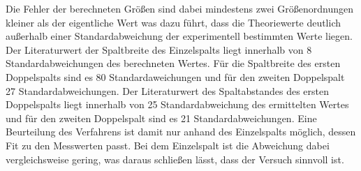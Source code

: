 Die Fehler der berechneten Größen sind dabei mindestens zwei Größenordnungen kleiner als der eigentliche Wert was dazu führt,
dass die Theoriewerte deutlich außerhalb einer Standardabweichung der experimentell bestimmten Werte liegen. Der
Literaturwert der Spaltbreite des Einzelspalts liegt innerhalb von 8 Standardabweichungen des berechneten Wertes. Für die
Spaltbreite des ersten Doppelspalts sind es 80 Standardaweichungen und für den zweiten Doppelspalt 27 Standardabweichungen.
Der Literaturwert des Spaltabstandes des ersten Doppelspalts liegt innerhalb von 25 Standardabweichung des
ermittelten Wertes und für den zweiten Doppelspalt sind es 21 Standardabweichungen. Eine Beurteilung des Verfahrens
ist damit nur anhand des Einzelspalts möglich, dessen Fit zu den Messwerten passt. Bei dem Einzelspalt 
ist die Abweichung dabei vergleichsweise gering, was daraus schließen lässt, dass der Versuch sinnvoll ist.
